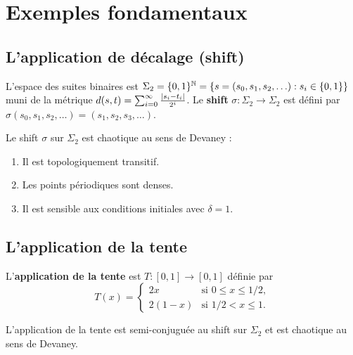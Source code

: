 \section{Exemples fondamentaux}

\subsection{L'application de d\'ecalage (shift)}

\begin{definition}
L'espace des suites binaires est
$\Sigma_2 = \{0, 1\}^{\mathbb{N}} = \{s = (s_0, s_1, s_2, \ldots) : s_i \in \{0, 1\}\}$
muni de la m\'etrique
$d(s, t) = \sum_{i=0}^{\infty} \frac{\left| s_i - t_i \right|}{2^i}$.
Le \textbf{shift} $\sigma : \Sigma_2 \to \Sigma_2$ est d\'efini par
$\sigma(s_0, s_1, s_2, \ldots) = (s_1, s_2, s_3, \ldots)$.
\end{definition}

\begin{theoreme}
Le shift $\sigma$ sur $\Sigma_2$ est chaotique au sens de Devaney :
\begin{enumerate}
    \item Il est topologiquement transitif.
    \item Les points p\'eriodiques sont denses.
    \item Il est sensible aux conditions initiales avec $\delta = 1$.
\end{enumerate}
\end{theoreme}

\subsection{L'application de la tente}

\begin{definition}
L'\textbf{application de la tente} est $T : [0,1] \to [0,1]$ d\'efinie par
\[
    T(x) = \begin{cases} 2x & \text{si } 0 \leq x \leq 1/2, \\ 2(1-x) & \text{si } 1/2 < x \leq 1. \end{cases}
\]
\end{definition}

\begin{proposition}
L'application de la tente est semi-conjugu\'ee au shift sur $\Sigma_2$
et est chaotique au sens de Devaney.
\end{proposition}

